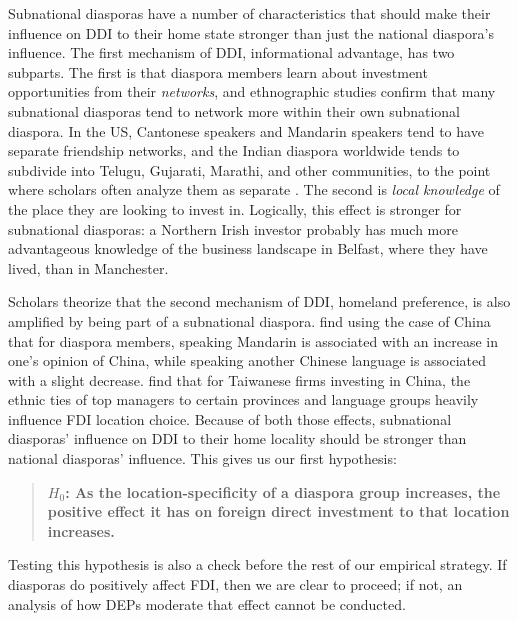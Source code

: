 \documentclass[12pt]{article}
\begin{document}
Subnational diasporas have a number of characteristics that should make their influence on DDI to their home state stronger than just the national diaspora's influence. The first mechanism of DDI, informational advantage, has two subparts. The first is that diaspora members learn about investment opportunities from their \textit{networks}, and ethnographic studies confirm that many subnational diasporas tend to network more within their own subnational diaspora. In the US, Cantonese speakers and Mandarin speakers tend to have separate friendship networks, and the Indian diaspora worldwide tends to subdivide into Telugu, Gujarati, Marathi, and other communities, to the point where scholars often analyze them as separate \citep{yan_subethnic_2019, sahoo_issues_2006}. The second is \textit{local knowledge} of the place they are looking to invest in. Logically, this effect is stronger for subnational diasporas: a Northern Irish investor probably has much more advantageous knowledge of the business landscape in Belfast, where they have lived, than in Manchester.

Scholars theorize that the second mechanism of DDI, homeland preference, is also amplified by being part of a subnational diaspora. \citet{xu_languages_2026} find using the case of China that for diaspora members, speaking Mandarin is associated with an increase in one's opinion of China, while speaking another Chinese language is associated with a slight decrease. \citet{jean_ethnic_2011} find that for Taiwanese firms investing in China, the ethnic ties of top managers to certain provinces and language groups heavily influence FDI location choice. Because of both those effects, subnational diasporas' influence on DDI to their home locality should be stronger than national diasporas' influence. This gives us our first hypothesis:

\begin{quote}
\textbf{$H_0$: As the location-specificity of a diaspora group increases, the positive effect it has on foreign direct investment to that location increases.}
\end{quote}

Testing this hypothesis is also a check before the rest of our empirical strategy. If diasporas do positively affect FDI, then we are clear to proceed; if not, an analysis of how DEPs moderate that effect cannot be conducted.
\end{document}
